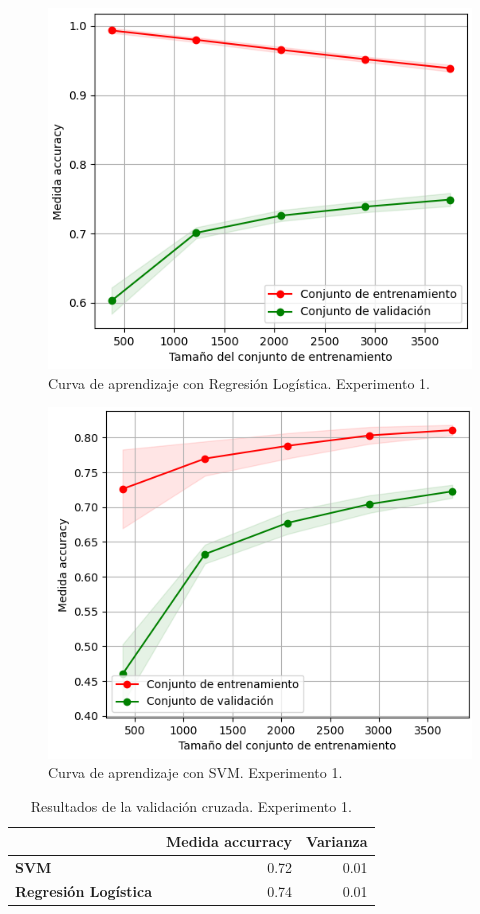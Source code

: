 \begin{figure}
\begin{center}
\includegraphics[width= 0.5\columnwidth]{Graphics/1}
\caption{Curva de aprendizaje con Regresi\'on Log\'istica. Experimento 1.}
\label{calr1}
\end{center}
\end{figure}

\begin{figure}
\begin{center}
\includegraphics[width= 0.5\columnwidth]{Graphics/2}
\caption{Curva de aprendizaje con SVM. Experimento 1.}
\label{casvm1}
\end{center}
\end{figure}

\begin{table}
\begin{center}
\begin{tabular}{l|r|r} 
   & \bf Medida accurracy & \bf Varianza \\ \hline
 \bf SVM & 0.72 & 0.01 \\ 
 \bf Regresi\'on Log\'istica & 0.74 & 0.01 \\ 
\end{tabular}
\caption{Resultados de la validaci\'on cruzada. Experimento 1.}\label{r1}
\end{center}
\end{table}

